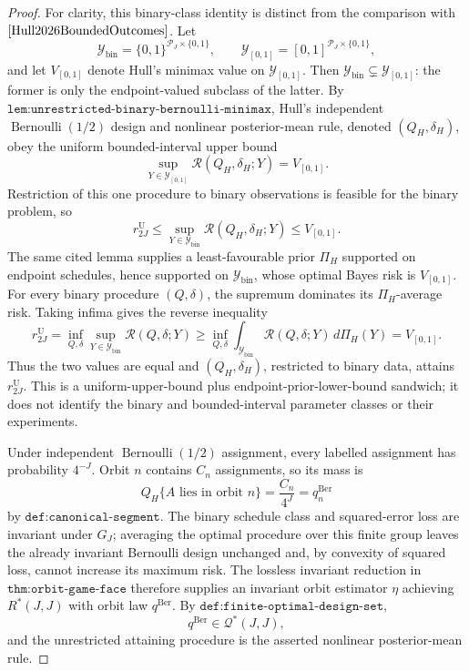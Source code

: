 \documentclass{article}
\begin{document}
\begin{proof}
For clarity, this binary-class identity is distinct from the comparison with \(\cite{Hull2026BoundedOutcomes}\).  Let
\[
 \mathcal Y_{\mathrm{bin}}=\{0,1\}^{\mathcal P_J\times\{0,1\}},
 \qquad
 \mathcal Y_{[0,1]}=[0,1]^{\mathcal P_J\times\{0,1\}},
\]
and let \(V_{[0,1]}\) denote Hull's minimax value on \(\mathcal Y_{[0,1]}\).  Then \(\mathcal Y_{\mathrm{bin}}\subsetneq\mathcal Y_{[0,1]}\): the former is only the endpoint-valued subclass of the latter.  By \(\texttt{lem:unrestricted-binary-bernoulli-minimax}\), Hull's independent \(\operatorname{Bernoulli}(1/2)\) design and nonlinear posterior-mean rule, denoted \((Q_H,\delta_H)\), obey the uniform bounded-interval upper bound
\[
 \sup_{Y\in\mathcal Y_{[0,1]}}
 \mathcal R(Q_H,\delta_H;Y)=V_{[0,1]}.
\]
Restriction of this one procedure to binary observations is feasible for the binary problem, so
\[
 r^{\mathrm U}_{2J}
 \le \sup_{Y\in\mathcal Y_{\mathrm{bin}}}
 \mathcal R(Q_H,\delta_H;Y)
 \le V_{[0,1]}.
\]
The same cited lemma supplies a least-favourable prior \(\Pi_H\) supported on endpoint schedules, hence supported on \(\mathcal Y_{\mathrm{bin}}\), whose optimal Bayes risk is \(V_{[0,1]}\).  For every binary procedure \((Q,\delta)\), the supremum dominates its \(\Pi_H\)-average risk.  Taking infima gives the reverse inequality
\[
 r^{\mathrm U}_{2J}
 =\inf_{Q,\delta}\sup_{Y\in\mathcal Y_{\mathrm{bin}}}
 \mathcal R(Q,\delta;Y)
 \ge
 \inf_{Q,\delta}\int_{\mathcal Y_{\mathrm{bin}}}
 \mathcal R(Q,\delta;Y)\,d\Pi_H(Y)
 =V_{[0,1]}.
\]
Thus the two values are equal and \((Q_H,\delta_H)\), restricted to binary data, attains \(r^{\mathrm U}_{2J}\).  This is a uniform-upper-bound plus endpoint-prior-lower-bound sandwich; it does not identify the binary and bounded-interval parameter classes or their experiments.

Under independent \(\operatorname{Bernoulli}(1/2)\) assignment, every labelled assignment has probability \(4^{-J}\).  Orbit \(n\) contains \(C_n\) assignments, so its mass is
\[
 Q_H\{A\text{ lies in orbit }n\}=\frac{C_n}{4^J}=q_n^{\mathrm{Ber}}
\]
by \(\texttt{def:canonical-segment}\).  The binary schedule class and squared-error loss are invariant under \(G_J\); averaging the optimal procedure over this finite group leaves the already invariant Bernoulli design unchanged and, by convexity of squared loss, cannot increase its maximum risk.  The lossless invariant reduction in \(\texttt{thm:orbit-game-face}\) therefore supplies an invariant orbit estimator \(\eta\) achieving \(R^*(J,J)\) with orbit law \(q^{\mathrm{Ber}}\).  By \(\texttt{def:finite-optimal-design-set}\),
\[
 q^{\mathrm{Ber}}\in\mathcal Q^*(J,J),
\]
and the unrestricted attaining procedure is the asserted nonlinear posterior-mean rule.
\end{proof}
\end{document}
